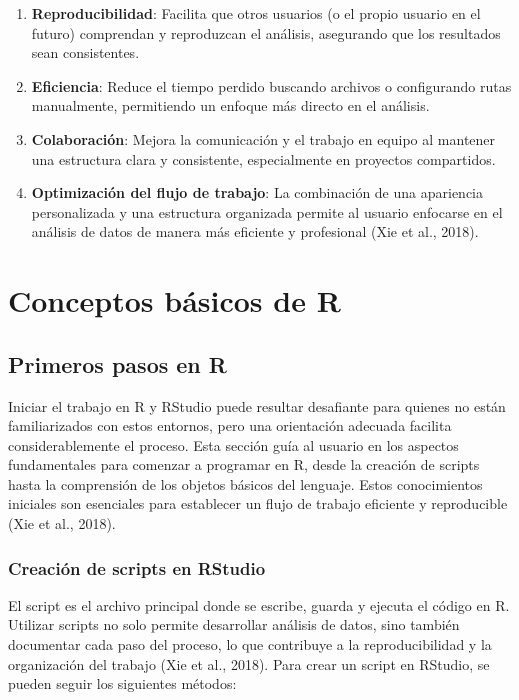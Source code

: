 \documentclass[
  spanish,
  a4paper,
  DIV=11,
  numbers=noendperiod,
  onepage,
  openany]{scrreprt}
\begin{document}
\begin{enumerate}
\def\labelenumi{\arabic{enumi}.}
\item
  \textbf{Reproducibilidad}: Facilita que otros usuarios (o el propio
  usuario en el futuro) comprendan y reproduzcan el análisis, asegurando
  que los resultados sean consistentes.
\item
  \textbf{Eficiencia}: Reduce el tiempo perdido buscando archivos o
  configurando rutas manualmente, permitiendo un enfoque más directo en
  el análisis.
\item
  \textbf{Colaboración}: Mejora la comunicación y el trabajo en equipo
  al mantener una estructura clara y consistente, especialmente en
  proyectos compartidos.
\item
  \textbf{Optimización del flujo de trabajo}: La combinación de una
  apariencia personalizada y una estructura organizada permite al
  usuario enfocarse en el análisis de datos de manera más eficiente y
  profesional (Xie et al., 2018).
\end{enumerate}

\part{Conceptos básicos de R}


\chapter{Primeros pasos en R}\label{primeros-pasos-en-r}

Iniciar el trabajo en R y RStudio puede resultar desafiante para quienes
no están familiarizados con estos entornos, pero una orientación
adecuada facilita considerablemente el proceso. Esta sección guía al
usuario en los aspectos fundamentales para comenzar a programar en R,
desde la creación de scripts hasta la comprensión de los objetos básicos
del lenguaje. Estos conocimientos iniciales son esenciales para
establecer un flujo de trabajo eficiente y reproducible (Xie et al.,
2018).

\section{Creación de scripts en
RStudio}\label{creaciuxf3n-de-scripts-en-rstudio}

El script es el archivo principal donde se escribe, guarda y ejecuta el
código en R. Utilizar scripts no solo permite desarrollar análisis de
datos, sino también documentar cada paso del proceso, lo que contribuye
a la reproducibilidad y la organización del trabajo (Xie et al., 2018).
Para crear un script en RStudio, se pueden seguir los siguientes
métodos:
\end{document}
